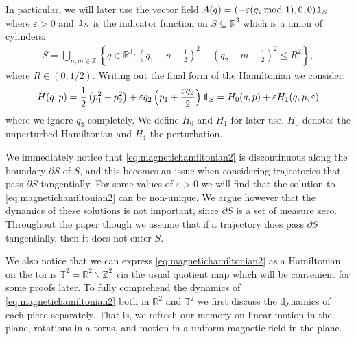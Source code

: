 In particular, we will later use the vector field $A(q) = (-\varepsilon(q_2\!\!\!\mod 1),0,0)\one_S$ where $\varepsilon>0$ and $\one_S$ is the indicator function on $S\subseteq \mathbb R^3$ which is a union of cylinders:
\begin{align*}
S = \bigcup_{n,m\in\mathbb Z} \left\{q\in\mathbb R^3: \left(q_1-n-\frac{1}{2}\right)^2+\left(q_2-m-\frac{1}{2}\right)^2\le R^2\right\}, 
\end{align*}
where $R\in (0,1/2)$. Writing out the final form of the Hamiltonian we consider:
\begin{align}\label{eq:magnetichamiltonian2}
H(q,p) = \frac{1}{2}\left(p_1^2+p_2^2\right) + \varepsilon q_2\left(p_1+\frac{\varepsilon q_2}{2}\right)\one_S = H_0(q,p) + \varepsilon H_1(q,p,\varepsilon)
\end{align}
where we ignore $q_3$ completely. We define $H_0$ and $H_1$ for later use, $H_0$ denotes the unperturbed Hamiltonian and $H_1$ the perturbation.

We immediately notice that \eqref{eq:magnetichamiltonian2} is discontinuous along the boundary $\partial S$ of $S$, and this becomes an issue when considering trajectories that pass $\partial S$ tangentially. For some values of $\varepsilon>0$ we will find that the solution to \eqref{eq:magnetichamiltonian2} can be non-unique. We argue however that the dynamics of these solutions is not important, since $\partial S$ is a set of measure zero. Throughout the paper though we assume that if a trajectory does pass $\partial S$ tangentially, then it does not enter $S$.

We also notice that we can express \eqref{eq:magnetichamiltonian2} as a Hamiltonian on the torus $\mathbb T^2=\mathbb R^2\backslash \mathbb Z^2$ via the usual quotient map which will be convenient for some proofs later. To fully comprehend the dynamics of \eqref{eq:magnetichamiltonian2} both in $\mathbb R^2$ and $\mathbb T^2$ we first discuss the dynamics of each piece separately. That is, we refresh our memory on linear motion in the plane, rotations in a torus, and motion in a uniform magnetic field in the plane.
